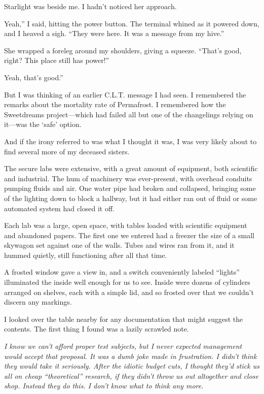 Starlight was beside me. I hadn’t noticed her approach.

\leavevmode{}Yeah,” I said, hitting the power button. The terminal whined as it powered down, and I heaved a sigh. “They were here. It was a message from my hive.”

She wrapped a foreleg around my shoulders, giving a squeeze. “That’s good, right? This place still has power!”

\leavevmode{}Yeah, that’s good.”

But I was thinking of an earlier C.L.T. message I had seen. I remembered the remarks about the mortality rate of Permafrost. I remembered how the Sweetdreams project—which had failed all but one of the changelings relying on it—was the ‘safe’ option.

And if the irony referred to was what I thought it was, I was very likely about to find several more of my deceased sisters.

{\br}%
The secure labs were extensive, with a great amount of equipment, both scientific and industrial. The hum of machinery was ever-present, with overhead conduits pumping fluids and air. One water pipe had broken and collapsed, bringing some of the lighting down to block a hallway, but it had either ran out of fluid or some automated system had closed it off.

Each lab was a large, open space, with tables loaded with scientific equipment and abandoned papers. The first one we entered had a freezer the size of a small skywagon set against one of the walls. Tubes and wires ran from it, and it hummed quietly, still functioning after all that time.

A frosted window gave a view in, and a switch conveniently labeled “lights” illuminated the inside well enough for us to see. Inside were dozens of cylinders arranged on shelves, each with a simple lid, and so frosted over that we couldn’t discern any markings.

I looked over the table nearby for any documentation that might suggest the contents. The first thing I found was a lazily scrawled note.

\textit{I know we can’t afford proper test subjects, but I never expected management would accept that proposal. It was a dumb joke made in frustration. I didn’t think they would take it seriously. After the idiotic budget cuts, I thought they’d stick us all on cheap “theoretical” research, if they didn’t throw us out altogether and close shop. Instead they do this. I don’t know what to think any more.}


